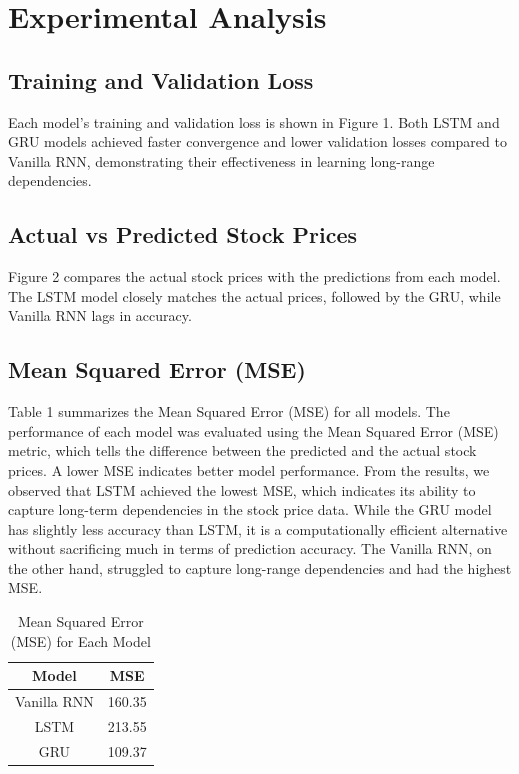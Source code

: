 \documentclass[10pt,twocolumn,a4paper]{article}
\begin{document}
\section{Experimental Analysis}

\subsection{Training and Validation Loss}
Each model’s training and validation loss is shown in Figure 1. Both LSTM and GRU models achieved faster convergence and lower validation losses compared to Vanilla RNN, demonstrating their effectiveness in learning long-range dependencies.

\subsection{Actual vs Predicted Stock Prices}
Figure 2 compares the actual stock prices with the predictions from each model. The LSTM model closely matches the actual prices, followed by the GRU, while Vanilla RNN lags in accuracy.

\subsection{Mean Squared Error (MSE)}
Table 1 summarizes the Mean Squared Error (MSE) for all models. The performance of each model was evaluated using the Mean Squared Error (MSE) metric, which tells the difference between the predicted and the actual stock prices. A lower MSE indicates better model performance. From the results, we observed that LSTM achieved the lowest MSE, which indicates its ability to capture long-term dependencies in the stock price data. While the GRU model has slightly less accuracy than LSTM, it is a computationally efficient alternative without sacrificing much in terms of prediction accuracy. The Vanilla RNN, on the other hand, struggled to capture long-range dependencies and had the highest MSE.

\begin{table}[h]
\centering
\begin{tabular}{|c|c|}
\hline
\textbf{Model} & \textbf{MSE} \\
\hline
Vanilla RNN & 160.35 \\
LSTM        & 213.55 \\
GRU         & 109.37 \\
\hline
\end{tabular}
\caption{Mean Squared Error (MSE) for Each Model}
\end{table}
\end{document}
